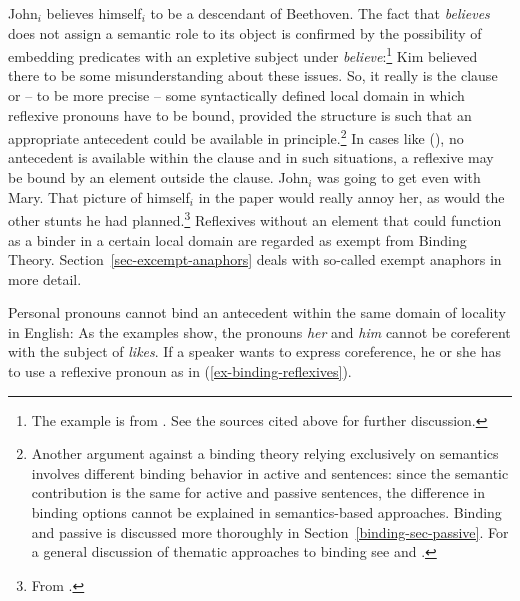 \documentclass[output=paper,biblatex,babelshorthands,newtxmath,draftmode,colorlinks,citecolor=brown]{langscibook}
\begin{document}
\ea
John$_i$ believes himself$_i$ to be a descendant of Beethoven.
\z
The fact that \emph{believes} does not assign a semantic role to its object is confirmed by the
possibility of embedding predicates with an expletive subject under \emph{believe}:\footnote{%
The example is from \citet[]{ps2}. See the sources cited above for further discussion.
}
\ea
Kim believed there to be some misunderstanding about these issues.
\z
So, it really is the clause or -- to be more precise -- some syntactically defined local domain in
which reflexive pronouns have to be bound, provided the structure is such that an
  appropriate antecedent could be available in principle.\footnote{%
Another argument against a binding theory relying exclusively on semantics involves different binding
behavior in active and  sentences: since the semantic contribution is the same for active
and passive sentences, the difference in binding options cannot be explained in semantics-based
approaches. Binding and passive is discussed more thoroughly in Section~\ref{binding-sec-passive}. 
For a general discussion of
thematic approaches to binding see  and .
}
In cases like (), no antecedent is available within the clause and in such situations, a
reflexive may be bound by an element outside the clause.
\eanoraggedright
\label{ex-stunts}
John$_i$ was going to get even with Mary. That picture of himself$_i$
in the paper would really annoy her, as would the other stunts he had planned.\footnote{
       From .
}
\z
Reflexives without an element that could function as a binder in a certain local domain are regarded
as exempt from Binding Theory. Section~\ref{sec-excempt-anaphors} deals with so-called exempt anaphors in more detail.

Personal pronouns cannot bind an antecedent within the same domain of locality in English:
\eal
{}
\zl
As the examples show, the pronouns \emph{her} and \emph{him} cannot be coreferent with the subject
of \emph{likes}. If a speaker wants to express coreference, he or she has to use a reflexive pronoun
as in (\ref{ex-binding-reflexives}). 
\end{document}
